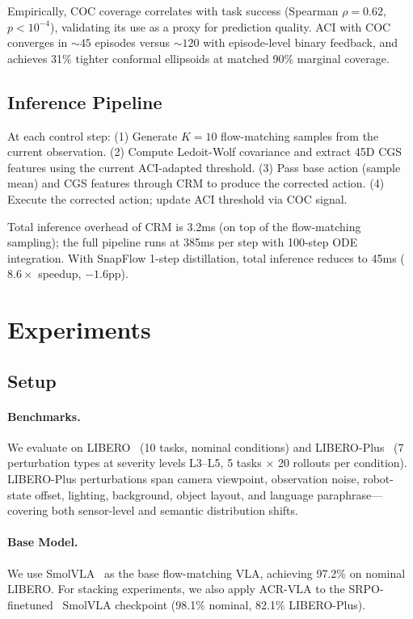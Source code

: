 \documentclass[10pt,letterpaper]{article}
\newcommand{\ours}{ACR-VLA}
\newcommand{\crm}{CRM}
\newcommand{\cgs}{CGS}
\newcommand{\aci}{ACI}
\begin{document}
Empirically, COC coverage correlates with task success (Spearman $\rho{=}0.62$, $p{<}10^{-4}$), validating its use as a proxy for prediction quality.
\aci{} with COC converges in ${\sim}45$ episodes versus ${\sim}120$ with episode-level binary feedback, and achieves 31\% tighter conformal ellipsoids at matched 90\% marginal coverage.

\subsection{Inference Pipeline}
\label{sec:inference}

At each control step:
(1) Generate $K{=}10$ flow-matching samples from the current observation.
(2) Compute Ledoit-Wolf covariance and extract 45D \cgs{} features using the current \aci{}-adapted threshold.
(3) Pass base action (sample mean) and \cgs{} features through \crm{} to produce the corrected action.
(4) Execute the corrected action; update \aci{} threshold via COC signal.

Total inference overhead of \crm{} is 3.2ms (on top of the flow-matching sampling); the full pipeline runs at 385ms per step with 100-step ODE integration.
With SnapFlow 1-step distillation, total inference reduces to 45ms ($8.6\times$ speedup, $-1.6$pp).

\section{Experiments}
\label{sec:experiments}

\subsection{Setup}
\label{sec:setup}

\paragraph{Benchmarks.}
We evaluate on LIBERO~\cite{liu2024libero} (10 tasks, nominal conditions) and LIBERO-Plus~\cite{liangplus2025} (7 perturbation types at severity levels L3--L5, 5 tasks $\times$ 20 rollouts per condition).
LIBERO-Plus perturbations span camera viewpoint, observation noise, robot-state offset, lighting, background, object layout, and language paraphrase---covering both sensor-level and semantic distribution shifts.

\paragraph{Base Model.}
We use SmolVLA~\cite{smolvla} as the base flow-matching VLA, achieving 97.2\% on nominal LIBERO.
For stacking experiments, we also apply \ours{} to the SRPO-finetuned~\cite{SRPO} SmolVLA checkpoint (98.1\% nominal, 82.1\% LIBERO-Plus).
\end{document}
